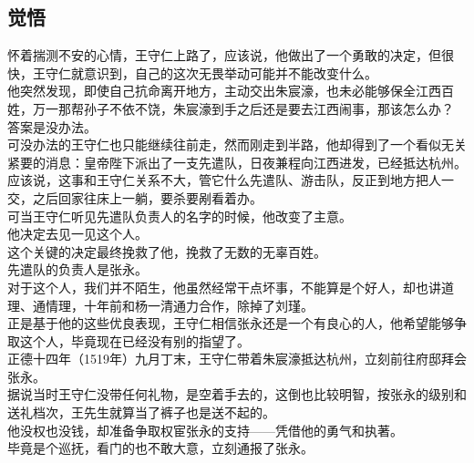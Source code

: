 \begin{multicols}{\theparacolNo}
\subsection{觉悟}
怀着揣测不安的心情，王守仁上路了，应该说，他做出了一个勇敢的决定，但很快，王守仁就意识到，自己的这次无畏举动可能并不能改变什么。\\

他突然发现，即使自己抗命离开地方，主动交出朱宸濠，也未必能够保全江西百姓，万一那帮孙子不依不饶，朱宸濠到手之后还是要去江西闹事，那该怎么办？\\

答案是没办法。\\

可没办法的王守仁也只能继续往前走，然而刚走到半路，他却得到了一个看似无关紧要的消息：皇帝陛下派出了一支先遣队，日夜兼程向江西进发，已经抵达杭州。\\

应该说，这事和王守仁关系不大，管它什么先遣队、游击队，反正到地方把人一交，之后回家往床上一躺，要杀要剐看着办。\\

可当王守仁听见先遣队负责人的名字的时候，他改变了主意。\\

他决定去见一见这个人。\\

这个关键的决定最终挽救了他，挽救了无数的无辜百姓。\\

先遣队的负责人是张永。\\

对于这个人，我们并不陌生，他虽然经常干点坏事，不能算是个好人，却也讲道理、通情理，十年前和杨一清通力合作，除掉了刘瑾。\\

正是基于他的这些优良表现，王守仁相信张永还是一个有良心的人，他希望能够争取这个人，毕竟现在已经没有别的指望了。\\

正德十四年（1519年）九月丁末，王守仁带着朱宸濠抵达杭州，立刻前往府邸拜会张永。\\

据说当时王守仁没带任何礼物，是空着手去的，这倒也比较明智，按张永的级别和送礼档次，王先生就算当了裤子也是送不起的。\\

他没权也没钱，却准备争取权宦张永的支持——凭借他的勇气和执著。\\

毕竟是个巡抚，看门的也不敢大意，立刻通报了张永。\\


\end{multicols}
